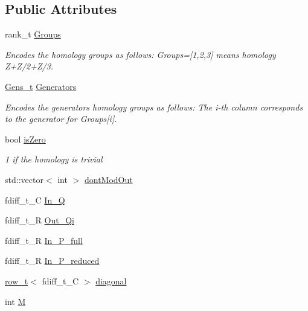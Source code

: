 \subsection*{Public Attributes}
\begin{DoxyCompactItemize}
\item 
rank\+\_\+t \hyperlink{classMackey_1_1Homology_aaae78e6463ce6e60e7f4c5861304bc5b}{Groups}
\begin{DoxyCompactList}\small\item\em Encodes the homology groups as follows\+: Groups=\mbox{[}1,2,3\mbox{]} means homology Z+\+Z/2+\+Z/3. \end{DoxyCompactList}\item 
\hyperlink{classMackey_1_1Homology_a986c3a6644aa52dc8279a26ade42fd64}{Gens\+\_\+t} \hyperlink{classMackey_1_1Homology_abceae7827c633cec7a9892826240c9cd}{Generators}
\begin{DoxyCompactList}\small\item\em Encodes the generators homology groups as follows\+: The i-\/th column corresponds to the generator for Groups\mbox{[}i\mbox{]}. \end{DoxyCompactList}\item 
bool \hyperlink{classMackey_1_1Homology_ae3bb3781bab2b5884295e04a8fddf36e}{is\+Zero}
\begin{DoxyCompactList}\small\item\em 1 if the homology is trivial \end{DoxyCompactList}\item 
std\+::vector$<$ int $>$ \hyperlink{classMackey_1_1Homology_a21c18ecdeea401821a56c7c00569190b}{dont\+Mod\+Out}
\item 
fdiff\+\_\+t\+\_\+C \hyperlink{classMackey_1_1Homology_a451ad6ea31ffe0ed18111f102ec2e370}{In\+\_\+Q}
\item 
fdiff\+\_\+t\+\_\+R \hyperlink{classMackey_1_1Homology_a49fa2fbf9542e38b4000f4889f633f62}{Out\+\_\+\+Qi}
\item 
fdiff\+\_\+t\+\_\+R \hyperlink{classMackey_1_1Homology_ad2f8d8e87b9ee4f6c2db72558ab8b2a8}{In\+\_\+\+P\+\_\+full}
\item 
fdiff\+\_\+t\+\_\+R \hyperlink{classMackey_1_1Homology_ae00a8d4ac6bdfd2de79045576200c6d2}{In\+\_\+\+P\+\_\+reduced}
\item 
\hyperlink{namespaceMackey_a6d37801553e585770ca7d1243ab3b213}{row\+\_\+t}$<$ fdiff\+\_\+t\+\_\+C $>$ \hyperlink{classMackey_1_1Homology_acff409513ea412c16b84f304d097059b}{diagonal}
\item 
int \hyperlink{classMackey_1_1Homology_a94b43567580dee325fda104b9abf38e3}{M}
\end{DoxyCompactItemize}
